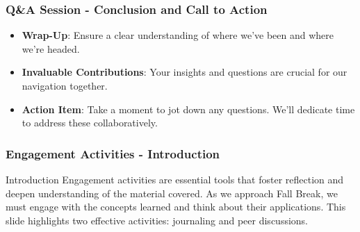 \documentclass[aspectratio=169]{beamer}
\begin{document}
\begin{frame}[fragile]
    \frametitle{Q\&A Session - Conclusion and Call to Action}
    \begin{itemize}
        \item \textbf{Wrap-Up}: Ensure a clear understanding of where we've been and where we're headed.
        \item \textbf{Invaluable Contributions}: Your insights and questions are crucial for our navigation together.
        \item \textbf{Action Item}: Take a moment to jot down any questions. We'll dedicate time to address these collaboratively.
    \end{itemize}
\end{frame}

\begin{frame}[fragile]
    \frametitle{Engagement Activities - Introduction}
    \begin{block}{Introduction}
        Engagement activities are essential tools that foster reflection and deepen understanding of the material covered. As we approach Fall Break, we must engage with the concepts learned and think about their applications. This slide highlights two effective activities: journaling and peer discussions.
    \end{block}
\end{frame}
\end{document}
